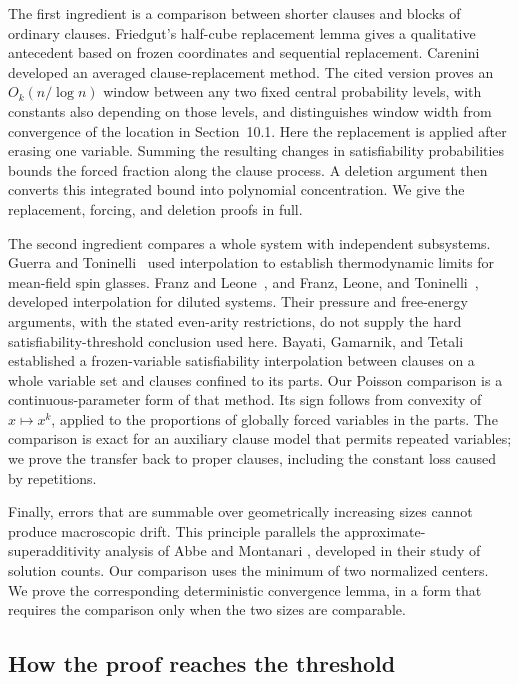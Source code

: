 The first ingredient is a comparison between shorter clauses and
blocks of ordinary clauses. Friedgut's half-cube replacement lemma
\cite[Lemma~5.7]{Friedgut} gives a qualitative antecedent based on frozen
coordinates and sequential replacement. Carenini
\cite[Lemma~6.1 and Corollaries~6.2, 7.10--7.11]{Carenini} developed an
averaged clause-replacement method. The cited version proves an
\(O_k(n/\log n)\) window between any two fixed central probability
levels, with constants also depending on those levels, and distinguishes
window width from convergence of the location in Section~10.1.
Here the replacement is applied after erasing one variable. Summing the
resulting changes in satisfiability probabilities bounds the forced
fraction along the clause process. A deletion argument then converts
this integrated bound into polynomial concentration. We give the
replacement, forcing, and deletion proofs in full.

The second ingredient compares a whole system with independent
subsystems. Guerra and Toninelli~\cite{GT} used interpolation to
establish thermodynamic limits for mean-field spin glasses.
Franz and Leone~\cite{FL}, and Franz, Leone, and Toninelli~\cite{FLT},
developed interpolation for diluted systems. Their pressure and
free-energy arguments, with the stated even-arity restrictions, do not
supply the hard satisfiability-threshold conclusion used here.
Bayati, Gamarnik, and Tetali~\cite[Section~4, Proposition~2]{BGT}
established a frozen-variable satisfiability interpolation between
clauses on a whole variable set and clauses confined to its parts.
Our Poisson comparison is a continuous-parameter form of that method.
Its sign follows from convexity of \(x\mapsto x^k\), applied to the
proportions of globally forced variables in the parts. The comparison
is exact for an auxiliary clause model that permits repeated variables;
we prove the transfer back to proper clauses, including the constant
loss caused by repetitions.

Finally, errors that are summable over geometrically increasing sizes
cannot produce macroscopic drift. This principle parallels the
approximate-superadditivity analysis of Abbe and Montanari
\cite[arXiv version, Section~4.3, Lemma~8 and Remark~3]{AM}, developed
in their study of solution counts. Our comparison uses the minimum of
two normalized centers. We prove the corresponding deterministic
convergence lemma, in a form that requires the comparison only when
the two sizes are comparable.

\subsection{How the proof reaches the threshold}

